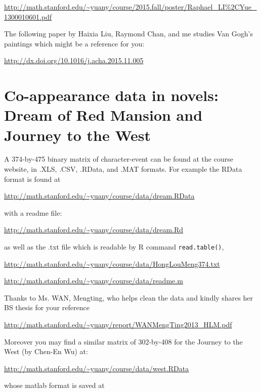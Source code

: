 \documentclass[11pt]{article}
\begin{document}
\url{http://math.stanford.edu/~yuany/course/2015.fall/poster/Raphael_LI\%2CYue_1300010601.pdf}

The following paper by Haixia Liu, Raymond Chan, and me studies Van Gogh's paintings which might be a reference for you:

\url{http://dx.doi.org/10.1016/j.acha.2015.11.005}


\section{Co-appearance data in novels: Dream of Red Mansion and Journey to the West}

A 374-by-475 binary matrix of character-event can be found at the course website, in .XLS, .CSV, .RData, and .MAT formats. For example the RData format is found at

\url{http://math.stanford.edu/~yuany/course/data/dream.RData} 

\noindent with a readme file:

\url{http://math.stanford.edu/~yuany/course/data/dream.Rd}

\noindent as well as the .txt file which is readable by R command {\tt read.table()},

\url{http://math.stanford.edu/~yuany/course/data/HongLouMeng374.txt}

\url{http://math.stanford.edu/~yuany/course/data/readme.m}

Thanks to Ms. WAN, Mengting, who helps clean the data and kindly shares her BS thesis for your reference
 
\url{http://math.stanford.edu/~yuany/report/WANMengTing2013_HLM.pdf}

%

Moreover you may find a similar matrix of 302-by-408 for the Journey to the West (by Chen-En Wu) at:

\url{http://math.stanford.edu/~yuany/course/data/west.RData}

\noindent whose matlab format is saved at
\end{document}
